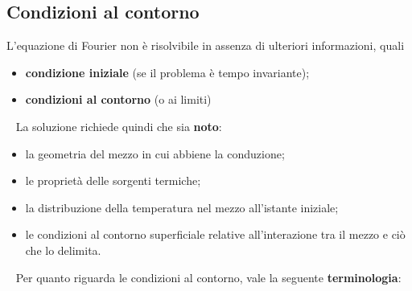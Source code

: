 \subsection{Condizioni al contorno}
L’equazione di Fourier non è risolvibile in assenza di ulteriori informazioni, quali
\begin{itemize}
    \item \textbf{condizione iniziale} (se il problema è tempo invariante);
    \item \textbf{condizioni al contorno} (o ai limiti)
\end{itemize}
\ \newline
La soluzione richiede quindi che sia \textbf{noto}:
\begin{itemize}
    \item la geometria del mezzo in cui abbiene la conduzione;
    \item le proprietà delle sorgenti termiche;
    \item la distribuzione della temperatura nel mezzo all'istante iniziale;
    \item le condizioni al contorno superficiale relative all'interazione tra il mezzo e ciò che lo delimita.
\end{itemize}
\ \newline
Per quanto riguarda le condizioni al contorno, vale la seguente \textbf{terminologia}:
